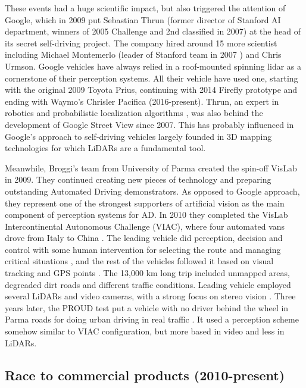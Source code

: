 These events had a huge scientific impact, but also triggered the attention of
Google, which in 2009 put Sebastian Thrun (former director of Stanford AI 
department, winners of 2005 Challenge and 2nd classified in 2007) at the 
head of its secret self-driving project. 
The company hired around 15 more scientist including Michael Montemerlo 
\cite{Montemerlo2003a} (leader of Stanford team in 2007 \cite{Montemerlo2008}) 
and Chris Urmson.
Google vehicles have always relied in a roof-mounted spinning lidar as 
a cornerstone of their perception systems. All their vehicle have used one, 
starting with the original 2009 Toyota Prius, continuing with 2014 Firefly
prototype and ending with Waymo's Chrisler Pacifica (2016-present).
Thrun, an expert in robotics and probabilistic localization algorithms
\cite{Levinson2011}, 
was also behind the development of Google Street View since 2007. 
This has probably influenced in Google's approach to self-driving vehicles 
largely founded in 3D mapping technologies \cite{Chapell2016} for which LiDARs
are a fundamental tool.
 
 
Meanwhile, Broggi's team from University of Parma created the spin-off VisLab
in 2009. They continued creating new pieces of technology and preparing 
outstanding Automated Driving demonstrators. As opposed to Google approach,
they represent one of the strongest supporters of artificial vision as the main 
component of perception systems for AD. In 2010 they 
completed the VisLab Intercontinental Autonomous Challenge (VIAC), where
four automated vans drove from Italy to China \cite{Bertozzi2011}.
The leading vehicle did perception, decision and control with some human 
intervention for selecting the route and managing critical situations
\cite{Broggi2012a}, and the rest of the vehicles followed it based on visual
tracking and GPS points \cite{Broggi2012a}. 
The 13,000 km long trip included unmapped areas, degreaded dirt roads and
different traffic conditions. Leading vehicle employed several LiDARs and
video cameras, with a strong focus on stereo vision \cite{Broggi2011}.
Three years later, the PROUD test put a vehicle with no driver behind the
wheel in Parma roads for doing urban driving in real traffic 
\cite{Broggi2013}. 
It used a perception scheme somehow similar to VIAC configuration, but more 
based in video and less in LiDARs.
 
\subsection{Race to commercial products (2010-present)}
 
